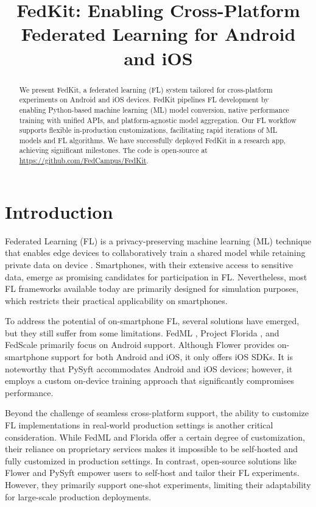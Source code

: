 \documentclass[letterpaper]{article} %
\title{FedKit: Enabling Cross-Platform Federated Learning for Android and iOS}
\author{}
\begin{document}
\maketitle

\begin{abstract}
    We present FedKit, a federated learning (FL) system tailored for
    cross-platform experiments on Android and iOS devices.
    FedKit pipelines FL development by
    enabling Python-based machine learning (ML) model conversion,
    native performance training with unified APIs,
    and platform-agnostic model aggregation.
    Our FL workflow supports flexible in-production customizations,
    facilitating rapid iterations of ML models and FL algorithms.
    We have successfully deployed FedKit in a research app,
    achieving significant milestones.
    The code is open-source at \url{https://github.com/FedCampus/FedKit}.
\end{abstract}

\section{Introduction}

Federated Learning (FL) 
is a privacy-preserving machine learning (ML) technique
that enables edge devices to collaboratively train a shared model while
retaining private data on device \cite{mcmahan2017communication}.
Smartphones, with their extensive access to sensitive data,
emerge as promising candidates for participation in FL.
Nevertheless, most FL frameworks \cite[e.g.,][]{bonawitz2019towards,liu2021fate,ma2019paddlepaddle,openfl_citation} available today are primarily designed for simulation purposes, which restricts their practical applicability on smartphones.

To address the potential of on-smartphone FL, several solutions have emerged, but they still suffer from some limitations. FedML \cite{he2020fedml}, Project Florida \cite{madrigal2023project}, and FedScale \cite{lai2022fedscale} primarily focus on Android support. Although Flower \cite{beutel2020flower,mathur2021ondevice} provides on-smartphone support for both Android and iOS, it only offers iOS SDKs. 
It is noteworthy that PySyft \cite{ryffel2018generic,Ziller2021,hall2021syft} accommodates Android and iOS devices; however, it employs a custom on-device training approach that significantly compromises performance.

Beyond the challenge of seamless cross-platform support, the ability to customize FL implementations in real-world production settings is another critical consideration. While FedML and Florida offer a certain degree of customization, their reliance on proprietary services makes it impossible to be self-hosted and fully customized in production settings. In contrast, open-source solutions like Flower and PySyft empower users to self-host and tailor their FL experiments. However, they primarily support one-shot experiments, limiting their adaptability for large-scale production deployments.
\end{document}
